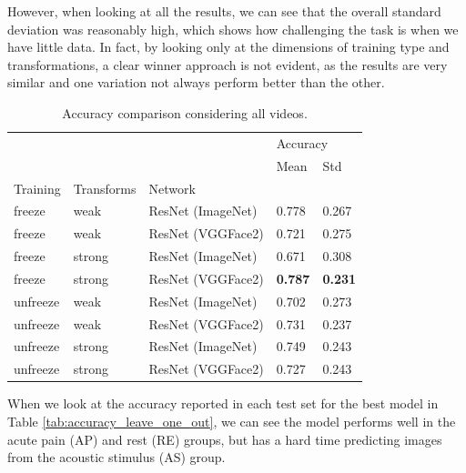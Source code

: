 However, when looking at all the results, we can see that the overall standard deviation was reasonably high, which shows how challenging the task is when we have little data. In fact, by looking only at the dimensions of training type and transformations, a clear winner approach is not evident, as the results are very similar and one variation not always perform better than the other.

\begin{table}[h!tp]
\centering
\caption{Accuracy comparison considering all videos.}
\label{tab:accuracy_all}
\begin{tabular}{lllll}
\toprule
         &        &          & \multicolumn{2}{l}{Accuracy} \\
         &        &          &     Mean &    Std \\
Training & Transforms & Network &          &        \\
\midrule
freeze   & weak   & ResNet (ImageNet) &    0.778 &  0.267 \\
freeze   & weak   & ResNet (VGGFace2) &    0.721 &  0.275 \\
freeze   & strong & ResNet (ImageNet) &    0.671 &  0.308 \\
freeze   & strong & ResNet (VGGFace2) &    \textbf{0.787} & \textbf{ 0.231} \\
unfreeze & weak   & ResNet (ImageNet) &    0.702 &  0.273 \\
unfreeze & weak   & ResNet (VGGFace2) &    0.731 &  0.237 \\
unfreeze & strong & ResNet (ImageNet) &    0.749 &  0.243 \\
unfreeze & strong & ResNet (VGGFace2) &    0.727 &  0.243 \\
\bottomrule
\end{tabular}
\end{table}

When we look at the accuracy reported in each test set for the best model in Table \ref{tab:accuracy_leave_one_out}, we can see the model performs well in the acute pain (AP) and rest (RE) groups, but has a hard time predicting images from the acoustic stimulus (AS) group.

